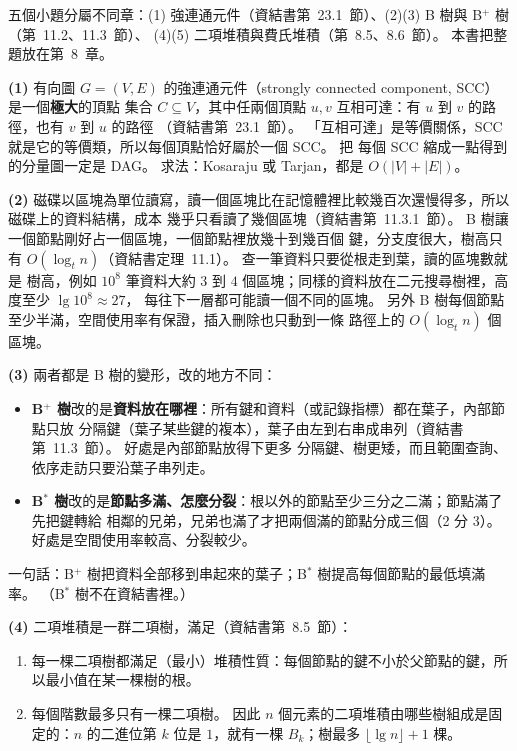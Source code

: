 \begin{pastsoln}
五個小題分屬不同章：(1) 強連通元件（資結書第~23.1~節）、(2)(3) B 樹與 B$^{+}$ 樹（第~11.2、11.3~節）、
(4)(5) 二項堆積與費氏堆積（第~8.5、8.6~節）。 本書把整題放在第~8~章。

\textbf{(1)} 有向圖 $G = (V, E)$ 的強連通元件（strongly connected component, SCC）是一個\textbf{極大}的頂點
集合 $C \subseteq V$，其中任兩個頂點 $u, v$ 互相可達：有 $u$ 到 $v$ 的路徑，也有 $v$ 到 $u$ 的路徑
（資結書第~23.1~節）。 「互相可達」是等價關係，SCC 就是它的等價類，所以每個頂點恰好屬於一個 SCC。 把
每個 SCC 縮成一點得到的分量圖一定是 DAG。 求法：Kosaraju 或 Tarjan，都是 $O(|V| + |E|)$。

\textbf{(2)} 磁碟以區塊為單位讀寫，讀一個區塊比在記憶體裡比較幾百次還慢得多，所以磁碟上的資料結構，成本
幾乎只看讀了幾個區塊（資結書第~11.3.1~節）。 B 樹讓一個節點剛好占一個區塊，一個節點裡放幾十到幾百個
鍵，分支度很大，樹高只有 $O(\log_t n)$（資結書定理~11.1）。 查一筆資料只要從根走到葉，讀的區塊數就是
樹高，例如 $10^8$ 筆資料大約 $3$ 到 $4$ 個區塊；同樣的資料放在二元搜尋樹裡，高度至少 $\lg 10^8 \approx 27$，
每往下一層都可能讀一個不同的區塊。 另外 B 樹每個節點至少半滿，空間使用率有保證，插入刪除也只動到一條
路徑上的 $O(\log_t n)$ 個區塊。

\textbf{(3)} 兩者都是 B 樹的變形，改的地方不同：
\begin{itemize}
\item \textbf{B$^{+}$ 樹}改的是\textbf{資料放在哪裡}：所有鍵和資料（或記錄指標）都在葉子，內部節點只放
分隔鍵（葉子某些鍵的複本），葉子由左到右串成串列（資結書第~11.3~節）。 好處是內部節點放得下更多
分隔鍵、樹更矮，而且範圍查詢、依序走訪只要沿葉子串列走。
\item \textbf{B$^*$ 樹}改的是\textbf{節點多滿、怎麼分裂}：根以外的節點至少三分之二滿；節點滿了先把鍵轉給
相鄰的兄弟，兄弟也滿了才把兩個滿的節點分成三個（2 分 3）。 好處是空間使用率較高、分裂較少。
\end{itemize}
一句話：B$^{+}$ 樹把資料全部移到串起來的葉子；B$^*$ 樹提高每個節點的最低填滿率。 （B$^*$ 樹不在資結書裡。）

\textbf{(4)} 二項堆積是一群二項樹，滿足（資結書第~8.5~節）：
\begin{enumerate}[label=(\roman*)]
\item 每一棵二項樹都滿足（最小）堆積性質：每個節點的鍵不小於父節點的鍵，所以最小值在某一棵樹的根。
\item 每個階數最多只有一棵二項樹。 因此 $n$ 個元素的二項堆積由哪些樹組成是固定的：$n$ 的二進位第 $k$ 位是
$1$，就有一棵 $B_k$；樹最多 $\lfloor \lg n \rfloor + 1$ 棵。
\end{enumerate}


\end{pastsoln}
